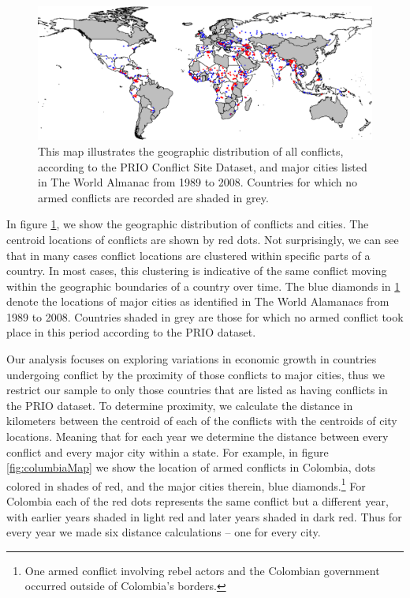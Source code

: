 \begin{figure}
	\centering
	\includegraphics[width=.9\textwidth]{CityConfMap-crop}
	\caption{This map illustrates the geographic distribution of all conflicts, according to the PRIO Conflict Site Dataset, and major cities listed in The World Almanac from 1989 to 2008. Countries for which no armed conflicts are recorded are shaded in grey.}
	\label{fig:CityConfMap}
\end{figure}
\FloatBarrier

In figure \ref{fig:CityConfMap}, we show the geographic distribution of conflicts and cities. The centroid locations of conflicts are shown by red dots. Not surprisingly, we can see that in many cases conflict locations are clustered within specific parts of a country. In most cases, this clustering is indicative of the same conflict moving within the geographic boundaries of a country over time. The blue diamonds in \ref{fig:CityConfMap} denote the locations of major cities as identified in The World Alamanacs from 1989 to 2008. Countries shaded in grey are those for which no armed conflict took place in this period according to the PRIO dataset.  

Our analysis focuses on exploring variations in economic growth in countries undergoing conflict by the proximity of those conflicts to major cities, thus we restrict our sample to only those countries that are listed as having conflicts in the PRIO dataset. To determine proximity, we calculate the distance in kilometers between the centroid of each of the conflicts with the centroids of city locations. Meaning that for each year we determine the distance between every conflict and every major city within a state. For example, in figure \ref{fig:columbiaMap} we show the location of armed conflicts in Colombia, dots colored in shades of red, and the major cities therein, blue diamonds.\footnote{One armed conflict involving rebel actors and the Colombian government occurred outside of Colombia's borders.} For Colombia each of the red dots represents the same conflict but a different year, with earlier years shaded in light red and later years shaded in dark red. Thus for every year we made six distance calculations -- one for every city.

